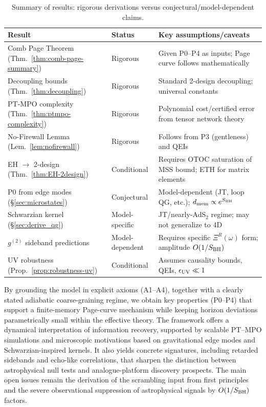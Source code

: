 \documentclass[a4paper,11pt]{article}
\theoremstyle{plain}
\theoremstyle{definition}
\theoremstyle{remark}
\begin{document}
\begin{table}[htbp]
\centering
\caption{Summary of results: rigorous derivations versus conjectural/model-dependent claims.}
\label{tab:rigorous_vs_conjectural}
\begin{tabular}{@{}p{4.5cm}p{2.8cm}p{6.5cm}@{}}
\toprule
\textbf{Result} & \textbf{Status} & \textbf{Key assumptions/caveats} \\
\midrule
Comb Page Theorem (Thm.~\ref{thm:comb-page-summary}) & Rigorous & Given P0--P4 as inputs; Page curve follows mathematically \\
Decoupling bounds (Thm.~\ref{thm:decoupling}) & Rigorous & Standard 2-design decoupling; universal constants \\
PT-MPO complexity (Thm.~\ref{thm:ptmpo-complexity}) & Rigorous & Polynomial cost/certified error from tensor network theory \\
No-Firewall Lemma (Lem.~\ref{lem:nofirewall}) & Rigorous & Follows from P3 (gentleness) and QEIs \\
\midrule
EH $\to$ 2-design (Thm.~\ref{thm:EH-2design}) & Conditional & Requires OTOC saturation of MSS bound; ETH for matrix elements \\
P0 from edge modes (\S\ref{sec:microstates}) & Conjectural & Model-dependent (JT, loop QG, etc.); $d_{\rm mem}\propto e^{S_{\rm BH}}$ \\
Schwarzian kernel (\S\ref{sec:derive_qg}) & Model-specific & JT/nearly-AdS$_2$ regime; may not generalize to 4D \\
$g^{(2)}$ sideband predictions & Model-dependent & Requires specific $\Xi^R(\omega)$ form; amplitude $O(1/S_{\rm BH})$ \\
UV robustness (Prop.~\ref{prop:robustness-uv}) & Conditional & Assumes causality bounds, QEIs, $\epsilon_{\rm UV}\ll 1$ \\
\bottomrule
\end{tabular}
\end{table}

By grounding the model in explicit axioms (A1--A4), together with a clearly stated adiabatic coarse-graining regime, we obtain key properties (P0--P4) that support a finite-memory Page-curve mechanism while keeping horizon deviations parametrically small within the effective theory. The framework offers a dynamical interpretation of information recovery, supported by scalable PT--MPO simulations and microscopic motivations based on gravitational edge modes and Schwarzian-inspired kernels. It also yields concrete signatures, including retarded sidebands and echo-like correlations, that sharpen the distinction between astrophysical null tests and analogue-platform discovery prospects. The main open issues remain the derivation of the scrambling input from first principles and the severe observational suppression of astrophysical signals by $O(1/S_{\rm BH})$ factors.
\end{document}
